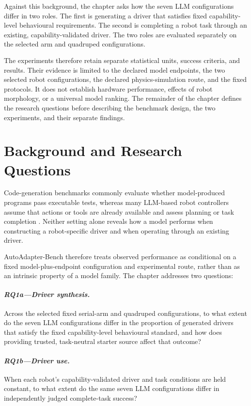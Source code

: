 Against this background, the chapter asks how the seven LLM configurations
differ in two roles. The first is generating a driver that satisfies fixed
capability-level behavioural requirements. The second is completing a robot
task through an existing, capability-validated driver. The two roles are
evaluated separately on the selected arm and quadruped configurations.

The experiments therefore retain separate statistical units, success
criteria, and results. Their evidence is limited to the declared model
endpoints, the two selected robot configurations, the declared
physics-simulation route, and the fixed protocols. It does not establish
hardware performance, effects of robot morphology, or a universal model
ranking. The remainder of the chapter defines the research questions before
describing the benchmark design, the two experiments, and their separate
findings.



\section[Background and Research Questions]{Background and Research Questions}

Code-generation benchmarks commonly evaluate whether model-produced programs
pass executable tests, whereas many LLM-based robot controllers assume that
actions or tools are already available and assess planning or task completion
\citep{chen2021codex,jimenez2024swebench,ahn2022saycan,
singh2023progprompt}. Neither setting alone reveals how a model performs when
constructing a robot-specific driver and when operating through an existing
driver.

AutoAdapter-Bench therefore treats observed performance as conditional on a
fixed model-plus-endpoint configuration and experimental route, rather than as
an intrinsic property of a model family. The chapter addresses two questions:

\paragraph{\textit{RQ1a---Driver synthesis.}}
Across the selected fixed serial-arm and quadruped configurations, to what
extent do the seven LLM configurations differ in the proportion of generated
drivers that satisfy the fixed capability-level behavioural standard, and
how does providing trusted, task-neutral starter source affect that outcome?

\paragraph{\textit{RQ1b---Driver use.}}
When each robot's capability-validated driver and task conditions are held
constant, to what extent do the same seven LLM configurations differ in
independently judged complete-task success?

